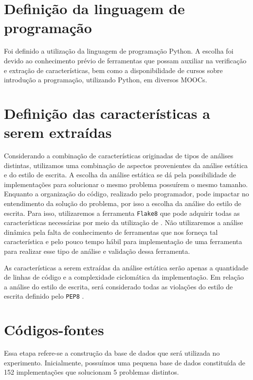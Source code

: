 	\section{Definição da linguagem de programação}
		Foi definido a utilização da linguagem de programação Python. A escolha foi
		devido ao conhecimento prévio de ferramentas que possam auxiliar na verificação
		e extração de características, bem como a disponibilidade de cursos sobre
		introdução a programação, utilizando Python, em diversos \acs{MOOC}s.

	\section{Definição das características a serem extraídas}
		Considerando a combinação de características originadas de tipos de análises
		distintas, utilizamos uma combinação de aspectos provenientes da análise  %
		estática e do estilo de escrita. A escolha da análise estática se dá pela
		possibilidade de implementações para solucionar o mesmo problema possuírem
		o mesmo tamanho. Enquanto a organização do código, realizado pelo programador,
		pode impactar no entendimento da solução do problema, por isso a escolha da
		análise do estilo de escrita. Para isso, utilizaremos a ferramenta \texttt{Flake8}
		\cite{flake8} que pode adquirir todas as características necessárias por meio da
		utilização de . Não utilizaremos a análise dinâmica pela falta
		de conhecimento de ferramentas que nos forneça tal característica e pelo pouco
		tempo hábil para implementação de uma ferramenta para realizar esse tipo de
		análise e validação dessa ferramenta.
		
		As características a serem extraídas da análise estática serão apenas a quantidade
		de linhas de código e a complexidade ciclomática da implementação. Em relação
		a análise do estilo de escrita, será considerado todas as violações do estilo de
		escrita definido pelo \texttt{PEP8} \cite{van2001pep}. 

	\section{Códigos-fontes}	
		Essa etapa refere-se a construção da base de dados que será utilizada no experimento.
		Inicialmente, possuímos uma pequena base de dados constituída de 152 implementações
		que solucionam 5 problemas distintos.
		
